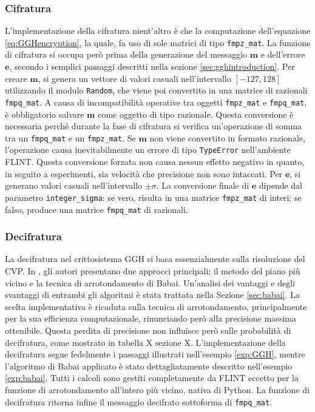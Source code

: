 \subsubsection{Cifratura}

L'implementazione della cifratura nient'altro è che la computazione dell'equazione 
\ref{eq:GGHencryption}, la quale, fa uso di sole matrici di tipo \texttt{fmpz\_mat}.
La funzione di cifratura si occupa però prima della generazione del messaggio $\mathbf{m}$ 
e dell'errore $\mathbf{e}$, secondo i semplici passaggi descritti nella sezione 
\ref{sec:gghintroduction}. 
Per creare $\mathbf{m}$, si genera un vettore di valori casuali nell'intervallo 
$[-127, 128]$ utilizzando il modulo \texttt{Random}, che viene poi convertito in 
una matrice di razionali \texttt{fmpq\_mat}. 
A causa di incompatibilità operative tra oggetti \texttt{fmpz\_mat} e \texttt{fmpq\_mat}, è
obbligatorio salvare $\mathbf{m}$ come oggetto di tipo razionale. Questa conversione 
è necessaria perché durante la fase di cifratura si verifica un'operazione di somma 
tra un \texttt{fmpq\_mat} e un \texttt{fmpz\_mat}. Se $\mathbf{m}$ non viene convertito 
in formato razionale, l'operazione causa inevitabilmente un errore di tipo 
\texttt{TypeError} nell'ambiente FLINT. Questa conversione forzata non causa nessun effetto
negativo in quanto, in seguito a esperimenti, sia velocità che precisione non sono intaccati.  
Per $\mathbf{e}$, si generano valori 
casuali nell'intervallo $\pm \sigma$. La conversione finale di $\mathbf{e}$ dipende 
dal parametro \texttt{integer\_sigma}: se vero, risulta in una matrice \texttt{fmpz\_mat} 
di interi; se falso, produce una matrice \texttt{fmpq\_mat} di razionali. 

\subsubsection{Decifratura}

La decifratura nel crittosistema GGH si basa essenzialmente sulla risoluzione del CVP. 
In \cite{GGH97}, gli autori presentano due approcci principali: il metodo del piano più 
vicino e la tecnica di arrotondamento di Babai. Un'analisi dei vantaggi e 
degli svantaggi di entrambi gli algoritmi è stata trattata nella Sezione \ref{sec:babai}. 
La scelta implementativa è ricaduta sulla tecnica di arrotondamento, principalmente per la sua 
efficienza computazionale, rinunciando però alla precisione massima ottenibile. Questa perdita
di precisione non influisce però sulle probabilità di decifratura, come mostrato in tabella
X sezione X. 
L'implementazione della decifratura segue fedelmente i passaggi illustrati nell'esempio 
\ref{exp:GGH}, mentre l'algoritmo di Babai applicato è stato dettagliatamente descritto 
nell'esempio \ref{exp:babai}. Tutti i calcoli sono gestiti completamente da FLINT eccetto
per la funzione di arrotondamento all'intero più vicino, nativa di Python. La funzione di 
decifratura ritorna infine il messaggio decifrato sottoforma di \texttt{fmpq\_mat}. 

